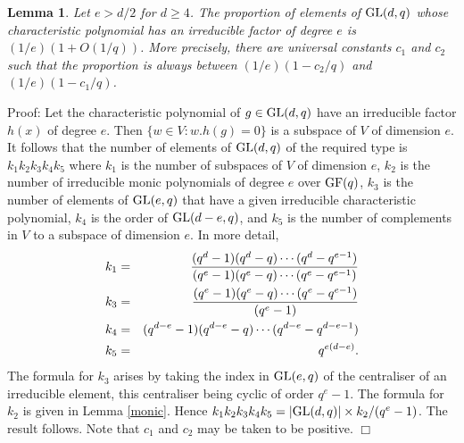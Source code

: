 \documentclass[12pt]{article}
\newtheorem{lemma}[definition]{Lemma}
\newenvironment{proof}{\normalsize {\sc Proof}:}{{\hfill $\Box$ \\}}
\def\GL{{\rm GL}}
\def\GF{{\rm GF}}
\begin{document}
\begin{lemma}\label{Lemma5.3} Let $e>d/2$ for $d \geq 4$. 
The proportion of elements of
$\GL(d,q)$ whose characteristic polynomial has an irreducible factor
of degree $e$ is $(1/e)(1+O(1/q))$. 
More precisely, there are
universal  constants $c_1$  and $c_2$ such that the proportion is always
between $(1/e)(1-c_2/q)$ and $(1/e)(1-c_1/q)$.
\end{lemma}
\begin{proof}
Let the characteristic polynomial of $g\in\GL(d,q)$ have an
irreducible factor $h(x)$ of degree $e$. Then $\{w\in V:w.h(g)=0\}$ is
a subspace of $V$ of dimension $e$. It follows that the number of
elements of $\GL(d,q)$ of the required type  is $k_1k_2k_3k_4k_5$
where $k_1$ is the number of subspaces of $V$ of dimension $e$, 
$k_2$ is the number of irreducible monic polynomials of degree $e$
over $\GF(q)$, $k_3$ is the number of elements of $\GL(e,q)$ that
have a given irreducible characteristic polynomial, $k_4$ is the
order of $\GL(d-e,q)$, and $k_5$ is the number of complements in
$V$ to a subspace of dimension $e$.
In more detail, 
\begin{eqnarray*}
k_1 & = & (q^d-1)(q^d-q)\cdots(q^d-q^{e-1})\over(q^e-1)(q^e-q) \cdots (q^e-q^{e-1}) \\
k_3 & = & (q^e-1)(q^e-q)\cdots(q^e-q^{e-1})\over (q^e-1) \\
k_4 & = & (q^{d-e}-1)(q^{d-e}-q) \cdots (q^{d-e}-q^{d-e-1}) \\
k_5 & = & q^{e(d-e)}.
\end{eqnarray*}
The formula for $k_3$ arises by taking
the index in $\GL(e,q)$ of the centraliser of an irreducible element,
this centraliser being cyclic of order $q^e-1$. 
The formula for $k_2$ is given in Lemma \ref{monic}. 
Hence $k_1 k_2 k_3 k_4 k_5 = \vert\GL(d,q)\vert\times k_2/(q^e-1)$. 
The result follows.  Note that $c_1$ and $c_2$ may be taken to be positive.
\end{proof}
\end{document}
